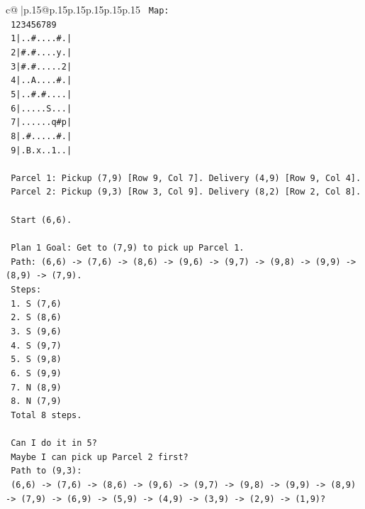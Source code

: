 \documentclass{article}
\begin{document}
{\begin{supertabular}{c@{$\;$}|p{.15\linewidth}@{}p{.15\linewidth}p{.15\linewidth}p{.15\linewidth}p{.15\linewidth}p{.15\linewidth}}
{{{\texttt{    Map:} \\
\texttt{    123456789} \\
\texttt{    1|..\#....\#.|} \\
\texttt{    2|\#.\#....y.|} \\
\texttt{    3|\#.\#.....2|} \\
\texttt{    4|..A....\#.|} \\
\texttt{    5|..\#.\#....|} \\
\texttt{    6|.....S...|} \\
\texttt{    7|......q\#p|} \\
\texttt{    8|.\#.....\#.|} \\
\texttt{    9|.B.x..1..|} \\
\\ 
\texttt{    Parcel 1: Pickup (7,9) {[}Row 9, Col 7{]}. Delivery (4,9) {[}Row 9, Col 4{]}.} \\
\texttt{    Parcel 2: Pickup (9,3) {[}Row 3, Col 9{]}. Delivery (8,2) {[}Row 2, Col 8{]}.} \\
\\ 
\texttt{    Start (6,6).} \\
\\ 
\texttt{    Plan 1 Goal: Get to (7,9) to pick up Parcel 1.} \\
\texttt{    Path: (6,6) {-}> (7,6) {-}> (8,6) {-}> (9,6) {-}> (9,7) {-}> (9,8) {-}> (9,9) {-}> (8,9) {-}> (7,9).} \\
\texttt{    Steps:} \\
\texttt{    1. S (7,6)} \\
\texttt{    2. S (8,6)} \\
\texttt{    3. S (9,6)} \\
\texttt{    4. S (9,7)} \\
\texttt{    5. S (9,8)} \\
\texttt{    6. S (9,9)} \\
\texttt{    7. N (8,9)} \\
\texttt{    8. N (7,9)} \\
\texttt{    Total 8 steps.} \\
\\ 
\texttt{    Can I do it in 5?} \\
\texttt{    Maybe I can pick up Parcel 2 first?} \\
\texttt{    Path to (9,3):} \\
\texttt{    (6,6) {-}> (7,6) {-}> (8,6) {-}> (9,6) {-}> (9,7) {-}> (9,8) {-}> (9,9) {-}> (8,9) {-}> (7,9) {-}> (6,9) {-}> (5,9) {-}> (4,9) {-}> (3,9) {-}> (2,9) {-}> (1,9)?} \\
}}}
\end{supertabular}}
\end{document}
